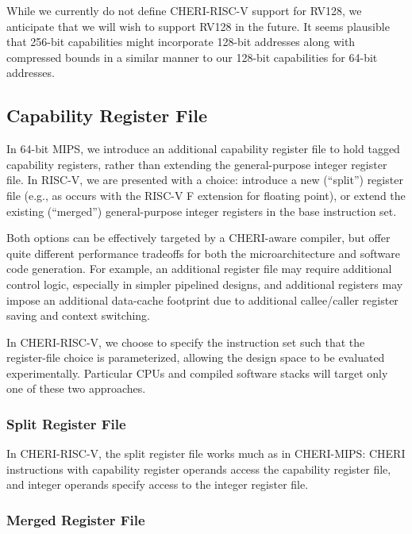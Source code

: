 While we currently do not define CHERI-RISC-V support for RV128, we anticipate
that we will wish to support RV128 in the future.
It seems plausible that 256-bit capabilities might incorporate 128-bit
addresses along with compressed bounds in a similar manner to our 128-bit
capabilities for 64-bit addresses.

\subsection{Capability Register File}

In 64-bit MIPS, we introduce an additional capability register file to hold
tagged capability registers, rather than extending the
general-purpose integer register file.
In RISC-V, we are presented with a choice: introduce a new (``split'')
register file (e.g., as occurs with the RISC-V F extension for floating
point), or extend the existing (``merged'') general-purpose integer registers in the
base instruction set.

Both options can be effectively targeted by a CHERI-aware compiler, but offer
quite different performance tradeoffs for both the microarchitecture and
software code generation.
For example, an additional register file may require additional control logic,
especially in simpler pipelined designs, and additional registers may impose an
additional data-cache footprint due to additional callee/caller register saving and context switching.

In CHERI-RISC-V, we choose to specify the instruction set such that the
register-file choice is parameterized, allowing the design space to be
evaluated experimentally.
Particular CPUs and compiled software stacks will target only one of these two
approaches.

\subsubsection{Split Register File}

In CHERI-RISC-V, the split register file works much as in CHERI-MIPS: CHERI
instructions with capability register operands access the capability register
file, and integer operands specify access to the integer register file.


\subsubsection{Merged Register File}

